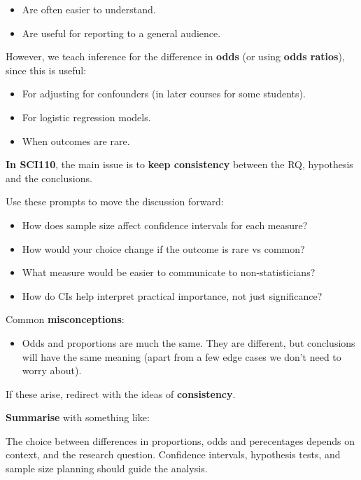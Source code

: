 \documentclass[
  11pt,
  a4paper,
  krantz2]{krantz}
\makeatletter
\providecommand{\tightlist}{%
  \setlength{\itemsep}{0pt}\setlength{\parskip}{0pt}}
\renewenvironment{quote}%
{\begin{kframe}}
{\end{kframe}}
\newenvironment{kframe}{%
\medskip{}
\setlength{\fboxsep}{.8em}
 \def\at@end@of@kframe{}%
 \ifinner\ifhmode%
  \def\at@end@of@kframe{\end{minipage}}%
  \begin{minipage}{\columnwidth}%
 \fi\fi%
 \def\FrameCommand##1{\hskip\@totalleftmargin \hskip-\fboxsep
 \colorbox{shadecolor}{##1}\hskip-\fboxsep
     \hskip-\linewidth \hskip-\@totalleftmargin \hskip\columnwidth}%
 \MakeFramed {\advance\hsize-\width
   \@totalleftmargin\z@ \linewidth\hsize
   \@setminipage}}%
 {\par\unskip\endMakeFramed%
 \at@end@of@kframe}
\renewenvironment{quote}
               {\list{}{\vspace{-0.5em}\begin{kframe}\small%
                        \rightmargin   \leftmargin
                        \parsep        \z@ \@plus\p@}%
                \item\relax}
               {\end{kframe}\endlist}
\makeatother
\begin{document}
\begin{itemize}
\tightlist
\item
  Are often easier to understand.
\item
  Are useful for reporting to a general audience.
\end{itemize}

However, we teach inference for the difference in \textbf{odds} (or using \textbf{odds ratios}), since this is useful:

\begin{itemize}
\tightlist
\item
  For adjusting for confounders (in later courses for some students).
\item
  For logistic regression models.
\item
  When outcomes are rare.
\end{itemize}

\textbf{In SCI110}, the main issue is to \textbf{keep consistency} between the RQ, hypothesis and the conclusions.

Use these prompts to move the discussion forward:

\begin{itemize}
\tightlist
\item
  How does sample size affect confidence intervals for each measure?
\item
  How would your choice change if the outcome is rare vs common?
\item
  What measure would be easier to communicate to non-statisticians?
\item
  How do CIs help interpret practical importance, not just significance?
\end{itemize}

Common \textbf{misconceptions}:

\begin{itemize}
\tightlist
\item
  Odds and proportions are much the same.
  They are different, but conclusions will have the same meaning (apart from a few edge cases we don't need to worry about).
\end{itemize}

If these arise, redirect with the ideas of \textbf{consistency}.

\textbf{Summarise} with something like:

\begin{quote}
The choice between differences in proportions, odds and perecentages depends on context, and the research question.
Confidence intervals, hypothesis tests, and sample size planning should guide the analysis.
\end{quote}
\end{document}
